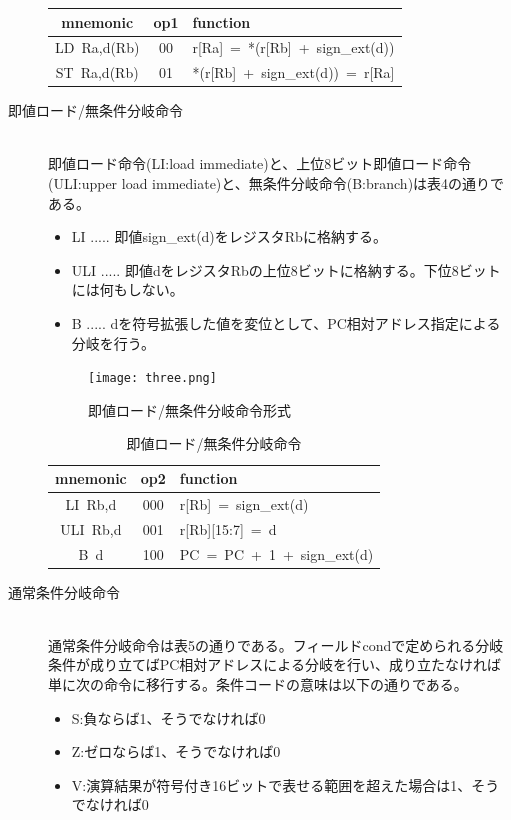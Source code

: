 \documentclass{jarticle}
\begin{document}
\begin{description}
\begin{table}[H]
\begin{tabular}{|c|c|l|}
  mnemonic & op1 & function \\ \hline
  LD\ Ra,d(Rb) & 00 & r[Ra]\ =\ *(r[Rb]\ +\ sign\_ext(d)) \\
  ST\ Ra,d(Rb) & 01 & *(r[Rb]\ +\ sign\_ext(d))\ =\ r[Ra] \\ \hline
  \end{tabular}
\end{table}
\item[即値ロード/無条件分岐命令] \leavevmode \\
即値ロード命令(LI:load immediate)と、上位8ビット即値ロード命令(ULI:upper load immediate)と、無条件分岐命令(B:branch)は表4の通りである。
\begin{itemize}
\item LI ..... 即値sign\_ext(d)をレジスタRbに格納する。
\item ULI ..... 即値dをレジスタRbの上位8ビットに格納する。下位8ビットには何もしない。
\item B ..... dを符号拡張した値を変位として、PC相対アドレス指定による分岐を行う。
\end{itemize}
\begin{figure}[H]
  \centering
  \caption{即値ロード/無条件分岐命令形式}
  \texttt{[image: three.png]}
\end{figure}
\begin{table}[H]
  \centering
  \caption{即値ロード/無条件分岐命令}
  \begin{tabular}{|c|c|l|} \hline
  mnemonic & op2 & function \\ \hline
  LI\ Rb,d & 000 & r[Rb]\ =\ sign\_ext(d) \\
  ULI\ Rb,d & 001 & r[Rb][15:7]\ =\ d \\
  B\ d & 100 & PC\ =\ PC\ +\ 1\ +\ sign\_ext(d) \\ \hline
  \end{tabular}
\end{table}
\item[通常条件分岐命令] \leavevmode \\
通常条件分岐命令は表5の通りである。フィールドcondで定められる分岐条件が成り立てばPC相対アドレスによる分岐を行い、成り立たなければ単に次の命令に移行する。条件コードの意味は以下の通りである。
\begin{itemize}
\item S:負ならば1、そうでなければ0
\item Z:ゼロならば1、そうでなければ0
\item V:演算結果が符号付き16ビットで表せる範囲を超えた場合は1、そうでなければ0
\end{itemize}

\end{description}
\end{document}
